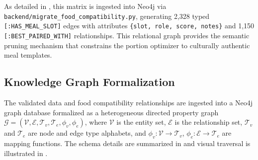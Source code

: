 \documentclass[5p,times,twocolumn]{elsarticle}
\begin{document}
As detailed in , this matrix is ingested into Neo4j via \texttt{backend/migrate\_food\_compatibility.py}, generating 2,328 typed \texttt{[:HAS\_MEAL\_SLOT]} edges with attributes \texttt{\{slot, role, score, notes\}} and 1,150 \texttt{[:BEST\_PAIRED\_WITH]} relationships. This relational graph provides the semantic pruning mechanism that constrains the portion optimizer to culturally authentic meal templates.

\subsection{Knowledge Graph Formalization}
\label{sec:kg_formalization}
The validated data and food compatibility relationships are ingested into a Neo4j graph database formalized as a heterogeneous directed property graph $\mathcal{G} = (\mathcal{V}, \mathcal{E}, \mathcal{T}_v, \mathcal{T}_e, \phi_v, \phi_e)$, where $\mathcal{V}$ is the entity set, $\mathcal{E}$ is the relationship set, $\mathcal{T}_v$ and $\mathcal{T}_e$ are node and edge type alphabets, and $\phi_v: \mathcal{V} \to \mathcal{T}_v$, $\phi_e: \mathcal{E} \to \mathcal{T}_e$ are mapping functions. The schema details are summarized in  and visual traversal is illustrated in .
\end{document}
